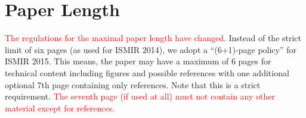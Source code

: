 \documentclass{article}
\begin{document}
	\section{Paper Length}
	\textcolor{red}{The regulations for the maximal paper length have changed.}
	Instead of the strict limit of six pages (as used for ISMIR 2014), we adopt 
	a ``(6+1)-page policy'' for ISMIR 2015. This means, the paper may have a 
	maximum of 6 pages for technical content including figures and possible references 
	with one additional optional 7th page containing only references.
	Note that this is a strict requirement. 
	\textcolor{red}{The seventh page (if used at all) must
	not contain any other material except for references.}




%
%
%
%
\end{document}
